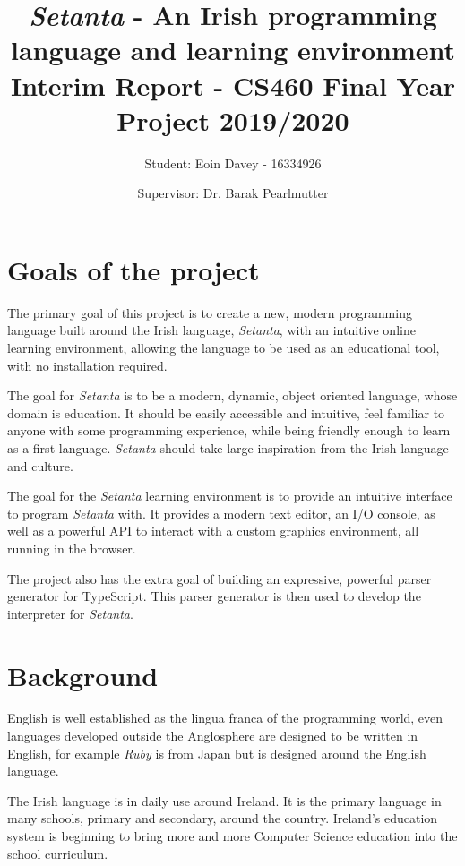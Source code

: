 \documentclass[11pt]{extarticle}
\newcommand{\Setanta}{\emph{Setanta}}
\begin{document}
    \title{
    \LARGE \textbf{\Setanta{} - An Irish programming language and learning environment}\\
    \Large Interim Report - CS460 Final Year Project 2019/2020}
    \author{\Large Student: Eoin Davey - 16334926 \and \Large Supervisor: Dr. Barak Pearlmutter}
    \maketitle
    \section{Goals of the project}

        The primary goal of this project is to create a new, modern programming language built around the Irish language, \Setanta{}, with an intuitive online learning environment, allowing the language to be used as an educational tool, with no installation required.

        The goal for \Setanta{} is to be a modern, dynamic, object oriented language, whose domain is education. It should be easily accessible and intuitive, feel familiar to anyone with some programming experience, while being friendly enough to learn as a first language. \Setanta{} should take large inspiration from the Irish language and culture.

        The goal for the \Setanta{} learning environment is to provide an intuitive interface to program \Setanta{} with. It provides a modern text editor, an I/O console, as well as a powerful API to interact with a custom graphics environment, all running in the browser.

        The project also has the extra goal of building an expressive, powerful parser generator for TypeScript. This parser generator is then used to develop the interpreter for \Setanta{}.

    \section{Background}

        English is well established as the lingua franca of the programming world, even languages developed outside the Anglosphere are designed to be written in English, for example \emph{Ruby} is from Japan but is designed around the English language.
        
        The Irish language is in daily use around Ireland. It is the primary language in many schools, primary and secondary, around the country. Ireland's education system is beginning to bring more and more Computer Science education into the school curriculum.
        
\end{document}
